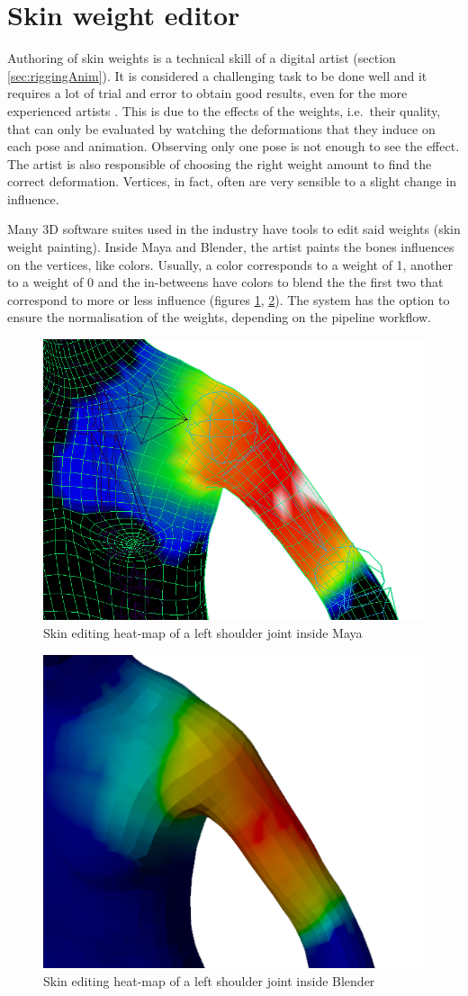 \documentclass[12pt,twoside]{report}
\begin{document}
\section{Skin weight editor}
\label{sec:skinedit}
Authoring of skin weights is a technical skill of a digital artist (section \ref{sec:riggingAnim}). It is considered a challenging task to be done well and it requires a lot of trial and error to obtain good results, even for the more experienced artists \cite{li2011automatic}. This is due to the effects of the weights, i.e.\ their quality, that can only be evaluated by watching the deformations that they induce on each pose and animation. Observing only one pose is not enough to see the effect. The artist is also responsible of choosing the right weight amount to find the correct deformation. Vertices, in fact, often are very sensible to a slight change in influence.

Many 3D software suites used in the industry have tools to edit said weights (skin weight painting). Inside Maya and Blender, the artist paints the bones influences on the vertices, like colors. Usually, a color corresponds to a weight of 1, another to a weight of 0 and the in-betweens have colors to blend the the first two that correspond to more or less influence (figures \ref{fig:skinEditing_maya}, \ref{fig:skinEditing_blender}). The system has the option to ensure the normalisation of the weights, depending on the pipeline workflow.

\begin{figure}[hp]
    \centering
    \includegraphics[width=35ex]{graphics/skinEditing_maya.png}
    \caption{Skin editing heat-map of a left shoulder joint inside Maya}
    \label{fig:skinEditing_maya}
\end{figure}

\begin{figure}[hp]
    \centering
    \includegraphics[width=35ex]{graphics/skinEditing_blender.png}
    \caption{Skin editing heat-map of a left shoulder joint inside Blender}
    \label{fig:skinEditing_blender}
\end{figure}
\end{document}

